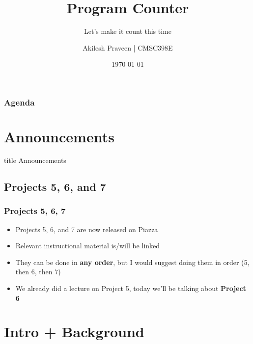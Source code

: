 \documentclass{beamer}
\title{Program Counter}
\subtitle{Let's make it count this time}
\author[CMSC389E]{Akilesh Praveen | CMSC398E}
\institute{UMD}
\date{\today}
\begin{document}
    \begin{frame}
        \titlepage
    \end{frame}
    
    \begin{frame}
        \frametitle{Agenda}
        \tableofcontents
    \end{frame}
    
    \section{Announcements}
    
        \begin{frame}
                \vfill
                \centering
                \begin{beamercolorbox}[sep=8pt,center,shadow=true,rounded=true]{title}
                    Announcements\par%
                \end{beamercolorbox}
                \vfill
             \end{frame}
    
        \subsection{Projects 5, 6, and 7}
        
            
            
            \begin{frame}
                \frametitle{Projects 5, 6, 7}
                \begin{itemize}
                    \item Projects 5, 6, and 7 are now released on Piazza
                    \item Relevant instructional material is/will be linked
                    \item They can be done in \textbf{any order}, but I would suggest doing them in order (5, then 6, then 7)
                    \item We already did a lecture on Project 5, today we'll be talking about \textbf{Project 6}
                    
                \end{itemize}
            \end{frame}
            
            
    \section{Intro + Background}
    
\end{document}

